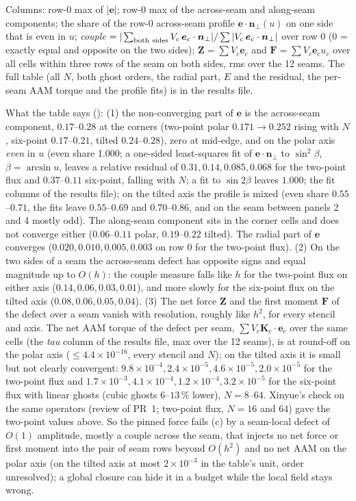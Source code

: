 Columns: row-0 max of $|\bm e|$; row-0 max of the across-seam and along-seam components; the share of the row-0
across-seam profile $\bm e\cdot\bm n_\perp(u)$ on one side that is even in $u$; \emph{couple} $=|\sum_{\rm both\ sides}
V_c\,\bm e_c\cdot\bm n_\perp|/\sum|V_c\,\bm e_c\cdot\bm n_\perp|$ over row 0 (0 = exactly equal and opposite on the two
sides); $\bm Z=\sum V_c\bm e_c$ and $\bm F=\sum V_c\bm e_c u_c$ over all cells within three rows of the seam on both
sides, rms over the 12 seams. The full table (all $N$, both ghost orders, the radial part, $E$ and the residual, the
per-seam AAM torque and the profile fits) is in the results file.

What the table says (\measured): (1) the non-converging part of $\bm e$ is the across-seam component, $0.17$--$0.28$
at the corners (two-point polar $0.171\to0.252$ rising with $N$, six-point $0.17$--$0.21$, tilted $0.24$--$0.28$),
zero at mid-edge, and on the polar axis \emph{even} in $u$ (even share 1.000; a one-sided least-squares fit of
$\bm e\cdot\bm n_\perp$ to $\sin^2\beta$, $\beta=\arcsin u$, leaves a relative residual of $0.31,0.14,0.085,0.068$ for the
two-point flux and $0.37$--$0.11$ six-point, falling with $N$; a fit to $\sin2\beta$ leaves $1.000$; the fit columns of
the results file); on the tilted axis the profile is mixed (even share $0.55$--$0.71$, the fits leave $0.55$--$0.69$ and
$0.70$--$0.86$, and on the seam between panels 2 and 4 mostly odd). The along-seam
component sits in the corner cells and does not converge either ($0.06$--$0.11$ polar, $0.19$--$0.22$ tilted).
The radial part of $\bm e$ converges ($0.020,0.010,0.005,0.003$ on row 0 for the two-point flux). (2) On the two sides
of a seam the across-seam defect has opposite signs and equal magnitude up to $O(h)$: the couple measure falls like
$h$ for the two-point flux on either axis ($0.14,0.06,0.03,0.01$), and more slowly for the six-point flux on the
tilted axis ($0.08,0.06,0.05,0.04$). (3) The net force $\bm Z$ and the first moment $\bm F$ of the defect over a seam
vanish with resolution, roughly like $h^2$, for every stencil and axis. The net AAM torque of the defect per seam,
$\sum V_c\bm K_c\cdot\bm e_c$ over the same cells (the \emph{tau} column of the results file, max over the 12 seams), is
at round-off on the polar axis ($\le4.4\times10^{-16}$, every stencil and $N$); on the tilted axis it is small but not
clearly convergent: $9.8\times10^{-4},2.4\times10^{-5},4.6\times10^{-5},2.0\times10^{-5}$ for the two-point flux and
$1.7\times10^{-3},4.1\times10^{-4},1.2\times10^{-4},3.2\times10^{-5}$ for the six-point flux with linear ghosts (cubic
ghosts $6$--$13\,\%$ lower), $N=8$--$64$. Xinyue's check on the same operators (review of PR~1; two-point flux, $N=16$ and $64$)
gave the two-point values above. So the pinned force fails (c) by a seam-local defect of $O(1)$ amplitude, mostly a
couple across the seam, that injects no net force or first moment into the pair of seam rows beyond $O(h^2)$ and no
net AAM on the polar axis (on the tilted axis at most $2\times10^{-3}$ in the table's unit, order unresolved); a global
closure can hide it in a budget while the local field stays wrong.

